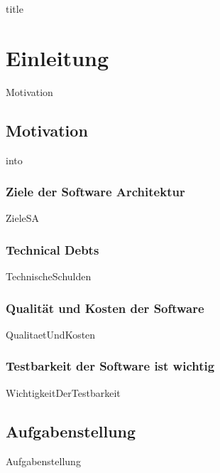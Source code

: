 \documentclass{article}
\begin{document}
{title}

\frontmatter

\tableofcontents

\listoffigures
\listoftables

\mainmatter

\section{Einleitung}
    {Motivation}

    \newpage
    \subsection{Motivation}
        {into}

    \subsubsection{Ziele der Software Architektur}
        {ZieleSA}
    \newpage
    \subsubsection{Technical Debts}
    \label{kap:technicalDebts}
        {TechnischeSchulden}

    \newpage
    \subsubsection{Qualität und Kosten der Software}
        {QualitaetUndKosten}
        
    \subsubsection{Testbarkeit der Software ist wichtig}
        {WichtigkeitDerTestbarkeit}
   
    \newpage

    \subsection{Aufgabenstellung}
    \label{kap:task}
        {Aufgabenstellung}
\end{document}
